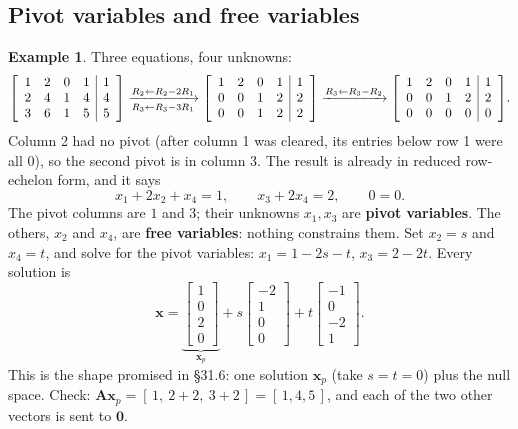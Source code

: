 \documentclass[11pt]{article}
\theoremstyle{plain}
\theoremstyle{definition}
\newtheorem{ex}{Example}[section]
\theoremstyle{remark}
\newcommand{\vc}[1]{\mathbf{#1}}
\newcommand{\mt}[1]{\mathbf{#1}}
\newenvironment{aug}[1]{\left[\begin{array}{#1}}{\end{array}\right]}
\begin{document}
\subsection{Pivot variables and free variables}
\begin{ex}
\label{ex:free}
Three equations, four unknowns:
\[
  \begin{aug}{cccc|c}1&2&0&1&1\\2&4&1&4&4\\3&6&1&5&5\end{aug}
  \xrightarrow[R_3\gets R_3-3R_1]{R_2\gets R_2-2R_1}
  \begin{aug}{cccc|c}1&2&0&1&1\\0&0&1&2&2\\0&0&1&2&2\end{aug}
  \xrightarrow{R_3\gets R_3-R_2}
  \begin{aug}{cccc|c}1&2&0&1&1\\0&0&1&2&2\\0&0&0&0&0\end{aug}.
\]
Column 2 had no pivot (after column 1 was cleared, its entries below row 1 were
all $0$), so the second pivot is in column 3. The result is already in reduced
row-echelon form, and it says
\[
  x_1+2x_2+x_4=1,\qquad x_3+2x_4=2,\qquad 0=0 .
\]
The pivot columns are $1$ and $3$; their unknowns $x_1,x_3$ are \textbf{pivot
variables}. The others, $x_2$ and $x_4$, are \textbf{free variables}: nothing
constrains them. Set $x_2=s$ and $x_4=t$, and solve for the pivot variables:
$x_1=1-2s-t$, $x_3=2-2t$. Every solution is
\[
  \vc{x}=
  \underbrace{\begin{bmatrix}1\\0\\2\\0\end{bmatrix}}_{\vc{x}_p}
  +s\begin{bmatrix}-2\\1\\0\\0\end{bmatrix}
  +t\begin{bmatrix}-1\\0\\-2\\1\end{bmatrix}.
\]
This is the shape promised in \S31.6: one solution $\vc{x}_p$ (take $s=t=0$) plus
the null space. Check: $\mt{A}\vc{x}_p=[\,1,\ 2+2,\ 3+2\,]=[\,1,4,5\,]$, and each
of the two other vectors is sent to $\vc{0}$.
\end{ex}
\end{document}
